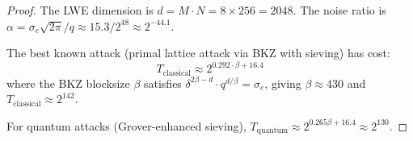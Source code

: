 \begin{proof}
The LWE dimension is $d = M \cdot N = 8 \times 256 = 2048$. The noise ratio is
$\alpha = \sigma_e \sqrt{2\pi} / q \approx 15.3 / 2^{48} \approx 2^{-44.1}$.

The best known attack (primal lattice attack via BKZ with sieving) has cost:
\[
T_{\text{classical}} \approx 2^{0.292 \cdot \beta + 16.4}
\]
where the BKZ blocksize $\beta$ satisfies $\delta^{2\beta - d} \cdot q^{d/\beta} = \sigma_e$,
giving $\beta \approx 430$ and $T_{\text{classical}} \approx 2^{142}$.

For quantum attacks (Grover-enhanced sieving), $T_{\text{quantum}} \approx 2^{0.265\beta + 16.4} \approx 2^{130}$.
\end{proof}

